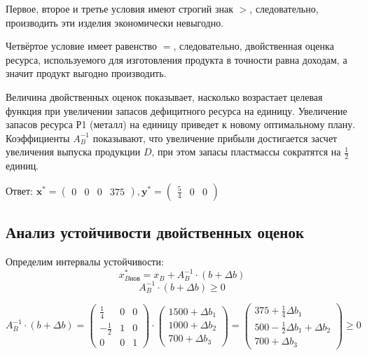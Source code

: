 Первое, второе и третье условия имеют строгий знак $>$, следовательно, производить эти изделия экономически невыгодно.

Четвёртое условие имеет равенство $=$, следовательно, двойственная оценка ресурса, используемого для изготовления продукта в точности равна доходам, а значит продукт выгодно производить.

Величина двойственных оценок показывает, насколько возрастает целевая функция при увеличении запасов дефицитного ресурса на единицу.
Увеличение запасов ресурса Р1 (металл) на единицу приведет к новому оптимальному плану.
Коэффициенты $A_B^{-1}$ показывают, что увеличение прибыли достигается засчет увеличения выпуска продукции $D$, при этом запасы пластмассы сократятся на $\frac{1}{2}$ единиц.

Ответ: $\mathbf{x^*} = \begin{pmatrix} 0 & 0 & 0 & 375 \end{pmatrix}, \mathbf{y^*} = \begin{pmatrix} \frac{5}{4} & 0 & 0 \end{pmatrix}$\label{04-lab-answer}

\subsection{Анализ устойчивости двойственных оценок}\label{04-lab-stability}

Определим интервалы устойчивости:
\[x^*_{B\text{нов}} = x_B + A_B^{-1} \cdot (b + \Delta b)\]
\[ A_B^{-1} \cdot (b + \Delta b) \geq 0 \]

\[
    A_B^{-1} \cdot (b + \Delta b) = \begin{pmatrix}
        \frac{1}{4}  & 0 & 0 \\
        -\frac{1}{2} & 1 & 0 \\
        0            & 0 & 1
    \end{pmatrix} \cdot \begin{pmatrix}
        1500 + \Delta b_1 \\
        1000 + \Delta b_2 \\
        700 + \Delta b_3
    \end{pmatrix} = \begin{pmatrix}
        375 + \frac{1}{4} \Delta b_1              \\
        500 - \frac{1}{2} \Delta b_1 + \Delta b_2 \\
        700 + \Delta b_3
    \end{pmatrix} \geq 0
\]

